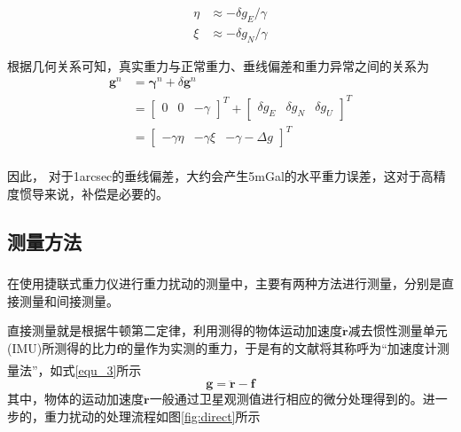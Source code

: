 \documentclass[12pt,a4,utf8]{article}
\newcommand{\upcite}[1]{\textsuperscript{\textsuperscript{\cite{#1}}}} %
\begin{document}
\begin{equation}
      \begin{aligned}
            \eta & \approx -\delta g_E / \gamma \\
            \xi  & \approx -\delta g_N / \gamma
      \end{aligned}
      \label{equ_1}
\end{equation}

根据几何关系可知，真实重力与正常重力、垂线偏差和重力异常之间的关系为
\begin{equation}
      \begin{aligned}
            \bm{g}^n & = \bm{\gamma}^n + \delta \bm{g}^n               \\
                     & =\begin{bmatrix}
                              0 & 0 & -\gamma
                        \end{bmatrix}^T +
            \begin{bmatrix}
                  \delta g_E & \delta g_N & \delta g_U
            \end{bmatrix}^T                       \\
                     & = \begin{bmatrix}
                               -\gamma\eta & -\gamma\xi & -\gamma - \Delta g
                         \end{bmatrix}^T
      \end{aligned}
      \label{equ_2}
\end{equation}

因此， 对于1arcsec的垂线偏差，大约会产生5mGal的水平重力误差\upcite{jekeli1994airborne}，这对于高精度惯导来说，补偿是必要的。

\subsection{测量方法}
在使用捷联式重力仪进行重力扰动的测量中，主要有两种方法进行测量\upcite{jekeli1997gps}，分别是直接测量和间接测量。

直接测量就是根据牛顿第二定律，利用测得的物体运动加速度$\bm{\ddot{r}}$减去惯性测量单元(IMU)所测得的比力$\bm{f}$的量作为实测的重力，于是有的文献将其称呼为“加速度计测量法”\upcite{johann2019direct}，如式\ref{equ_3}所示
\begin{equation}
      \bm{g} = \bm{\ddot{r}} - \bm{f}
      \label{equ_3}
\end{equation}
其中，物体的运动加速度$\bm{\ddot{r}}$一般通过卫星观测值进行相应的微分处理得到的。进一步的，重力扰动的处理流程如图\ref{fig:direct}所示
\end{document}
